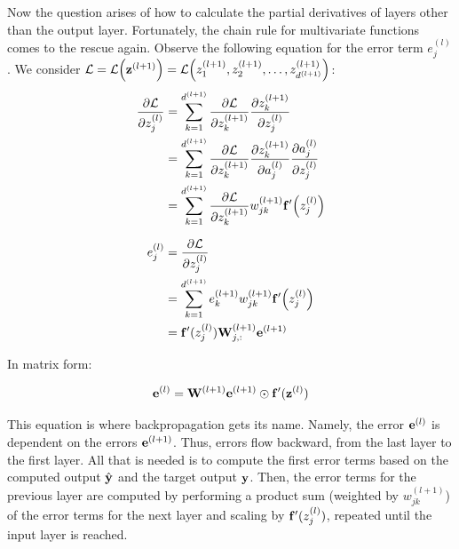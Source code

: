 \documentclass[14pt, a4paper]{article}
\numberwithin{equation}{section}
\numberwithin{algorithm}{section}
\numberwithin{figure}{section}
\begin{document}
Now the question arises of how to calculate the partial derivatives of layers other than the output layer. Fortunately, the chain rule for multivariate functions comes to the rescue again. Observe the following equation for the error term $e_j^{(l)}$.
We consider $\mathcal{L} = \mathcal{L}\Big(\bold{z}^{(l+1)}\Big)=\mathcal{L}\Big(z_1^{(l+1)}, z_2^{(l+1)}, \dots, z_{d^{(l+1)}}^{(l+1)}\Big)$:
\begin{equation}
	\begin{aligned}
		\dfrac{\partial \mathcal{L}}{\partial z_j^{(l)}}&=\sum_{k=1}^{d^{(l+1)}}\dfrac{\partial \mathcal{L}}{\partial z_k^{(l+1)}} \dfrac{\partial z_k^{(l+1)}}{\partial z_j^{(l)}}\\&=\sum_{k=1}^{d^{(l+1)}} \dfrac{\partial \mathcal{L}}{\partial z_k^{(l+1)}} \dfrac{\partial z_k^{(l+1)}}{\partial a_j^{(l)}} \dfrac{\partial a_j^{(l)}}{\partial z_j^{(l)}}\\&=\sum_{k=1}^{d^{(l+1)}}\dfrac{\partial \mathcal{L}}{\partial z_k^{(l+1)}}w_{jk}^{(l+1)}\bold{f}^{\prime}\Big(z_j^{(l)}\Big)
	\end{aligned}
\end{equation}

\begin{equation}
	\begin{aligned}
		e_j^{(l)}&=\dfrac{\partial \mathcal{L}}{\partial z_j^{(l)}}\\&=\sum_{k=1}^{d^{(l+1)}}e_k^{(l+1)}w_{jk}^{(l+1)}\bold{f}^{\prime}\Big(z_j^{(l)}\Big)\\&=\bold{f}^{\prime}(z_j^{(l)})\bold{W}_{j,:}^{(l+1)}\bold{e}^{(l+1)}
	\end{aligned}
\end{equation}

In matrix form:

\begin{equation}
  \bold{e}^{(l)}=\bold{W}^{(l+1)}\bold{e}^{(l+1)}\odot\bold{f}^{\prime}(\bold{z}^{(l)})
\end{equation}

This equation is where backpropagation gets its name. 
Namely, the error $\bold{e}^{(l)}$ is dependent on the errors $\bold{e}^{(l+1)}$.
Thus, errors flow backward, from the last layer to the first layer. 
All that is needed is to compute the first error terms based on the computed output $\hat{\bold{y}}$ and the target output $\bold{y}$.
Then, the error terms for the previous layer are computed by performing a product sum (weighted by $w_{jk}^{(l+1)}$) of the error terms for the next layer and scaling by $\bold{f}^{\prime}(z_j^{(l)})$, repeated until the input layer is reached.
\end{document}
